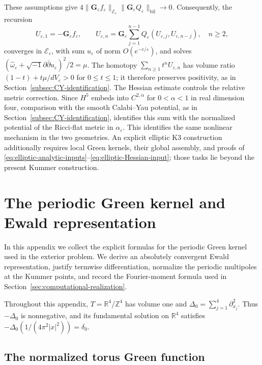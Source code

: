 \documentclass[11pt,a4paper,twoside]{article}
\numberwithin{equation}{section}
\newcommand{\ddc}{\sqrt{-1}\partial\bar\partial}
\theoremstyle{definition}
\theoremstyle{remark}
\newcommand{\ee}{\varepsilon}
\begin{document}
These assumptions give
\(4\|\mathbf G_\ee f_\ee\|_{\mathcal E_\ee}
\|\mathbf G_\ee Q_\ee\|_{\mathrm{bil}}\to0\).
Consequently, the recursion
\[
U_{\ee,1}=-\mathbf G_\ee f_\ee,\qquad
U_{\ee,n}=\mathbf G_\ee\sum_{j=1}^{n-1}
Q_\ee(U_{\ee,j},U_{\ee,n-j}),\quad n\ge2,
\]
converges in \(\mathcal E_\ee\), with sum \(u_\ee\) of norm
\(O(e^{-c/\ee})\), and solves
\((\widehat\omega_\ee+\ddc u_\ee)^2/2=\mu\).
The homotopy \(\sum_{n\ge1}t^nU_{\ee,n}\) has volume ratio
\((1-t)+t\mu/dV_\ee>0\) for \(0\le t\le1\); it therefore
preserves positivity, as in Section~\ref{subsec:CY-identification}.
The Hessian estimate controls the relative metric correction.
Since \(H^5\) embeds into \(C^{2,\alpha}\) for \(0<\alpha<1\)
in real dimension four, comparison with the smooth Calabi--Yau potential, as in
Section~\ref{subsec:CY-identification}, identifies this sum with
the normalized potential of the Ricci-flat metric in \(\alpha_\ee\).
This identifies the same nonlinear mechanism in the two geometries.
An explicit elliptic K3 construction additionally requires local
Green kernels, their global assembly, and proofs of
\eqref{eq:elliptic-analytic-inputs}--\eqref{eq:elliptic-Hessian-input};
those tasks lie beyond the present Kummer construction.

\clearpage
\appendix
\section{The periodic Green kernel and Ewald representation}
\label{app:ewald}

In this appendix we collect the explicit formulas for the periodic
Green kernel used in the exterior problem. We derive an absolutely
convergent Ewald representation, justify termwise differentiation,
normalize the periodic multipoles at the Kummer points, and record
the Fourier-moment formula used in
Section~\ref{sec:computational-realization}.

Throughout this appendix, \(T=\mathbb R^4/\mathbb Z^4\) has volume
one and \(\Delta_0=\sum_{j=1}^4\partial_{x_j}^2\). Thus
\(-\Delta_0\) is nonnegative, and its fundamental solution on
\(\mathbb R^4\) satisfies
\(-\Delta_0(1/(4\pi^2|x|^2))=\delta_0\).

\subsection{The normalized torus Green function}
\end{document}
